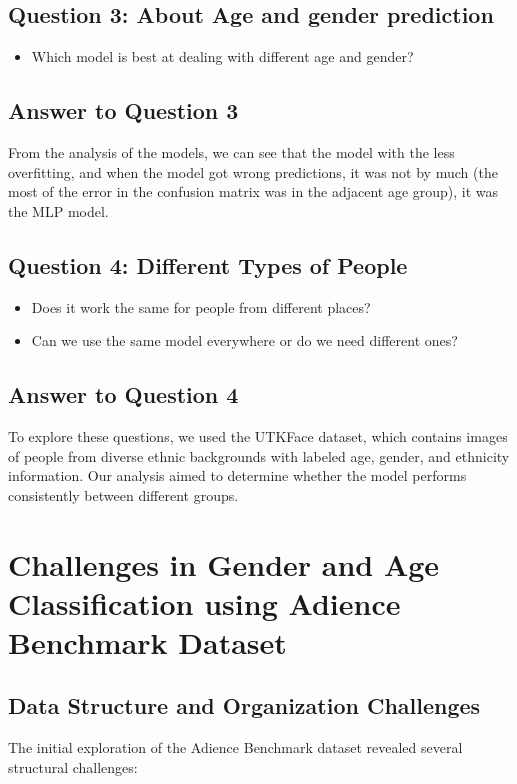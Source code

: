 \documentclass{article}
\begin{document}
\subsection*{Question 3: About Age and gender prediction}
\begin{itemize}[leftmargin=1.6cm]
    \item Which model is best at dealing with different age and gender?
    
\end{itemize}

\subsection*{Answer to Question 3}
From the analysis of the models, we can see that the model with the less overfitting, 
and when the model got wrong predictions, it was not by much (the most of the error in the confusion matrix was in the adjacent age group), it was the MLP model.

\subsection*{Question 4: Different Types of People}
\begin{itemize}[leftmargin=1.6cm]
    \item Does it work the same for people from different places?
    \item Can we use the same model everywhere or do we need different ones?
\end{itemize}

\subsection*{Answer to Question 4}  
To explore these questions, we used the UTKFace dataset, which contains images of people from diverse ethnic backgrounds with labeled age, gender, and ethnicity information. 
Our analysis aimed to determine whether the model performs consistently between different groups.  


\newpage
\section{Challenges in Gender and Age Classification using Adience Benchmark Dataset}

\subsection{Data Structure and Organization Challenges}
The initial exploration of the Adience Benchmark dataset revealed several structural challenges:
\end{document}
